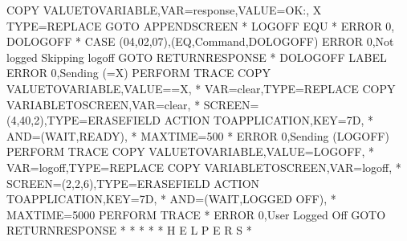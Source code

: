 \documentclass[letterpaper,10pt,english]{sphinxmanual}
\begin{document}
\begin{sphinxVerbatim}[commandchars=\\\{\}]
   COPY\PYGZdl{} VALUE\PYGZhy{}TO\PYGZhy{}VARIABLE,VAR=\PYGZsq{}response\PYGZsq{},VALUE=\PYGZsq{}OK:\PYGZsq{},           X
         TYPE=REPLACE
   GOTO\PYGZdl{} APPEND\PYGZus{}SCREEN
*
LOGOFF   EQU   *
   ERROR\PYGZdl{} 0,\PYGZsq{}\PYGZhy{}\PYGZhy{}\PYGZhy{} DOLOGOFF\PYGZsq{}
*
   CASE\PYGZdl{} (04,02,07),(EQ,\PYGZsq{}Command\PYGZsq{},DOLOGOFF)
   ERROR\PYGZdl{} 0,\PYGZsq{}Not logged \PYGZhy{} Skipping logoff\PYGZsq{}
   GOTO\PYGZdl{} RETURN\PYGZus{}RESPONSE
*
DOLOGOFF LABEL\PYGZdl{}
   ERROR\PYGZdl{} 0,\PYGZsq{}Sending (=X)\PYGZsq{}
   PERFORM\PYGZdl{} TRACE
   COPY\PYGZdl{} VALUE\PYGZhy{}TO\PYGZhy{}VARIABLE,VALUE=\PYGZsq{}=X\PYGZsq{},                           *
         VAR=\PYGZsq{}clear\PYGZsq{},TYPE=REPLACE
   COPY\PYGZdl{} VARIABLE\PYGZhy{}TO\PYGZhy{}SCREEN,VAR=\PYGZsq{}clear\PYGZsq{},                         *
         SCREEN=(4,40,2),TYPE=ERASE\PYGZhy{}FIELD
   ACTION\PYGZdl{}  TO\PYGZhy{}APPLICATION,KEY=7D,                               *
         AND=(WAIT,\PYGZsq{}READY\PYGZsq{}),                                     *
         MAXTIME=500
*
   ERROR\PYGZdl{} 0,\PYGZsq{}Sending (LOGOFF)\PYGZsq{}
   PERFORM\PYGZdl{} TRACE
   COPY\PYGZdl{} VALUE\PYGZhy{}TO\PYGZhy{}VARIABLE,VALUE=\PYGZsq{}LOGOFF\PYGZsq{},                       *
         VAR=\PYGZsq{}logoff\PYGZsq{},TYPE=REPLACE
   COPY\PYGZdl{} VARIABLE\PYGZhy{}TO\PYGZhy{}SCREEN,VAR=\PYGZsq{}logoff\PYGZsq{},                        *
         SCREEN=(2,2,6),TYPE=ERASE\PYGZhy{}FIELD
   ACTION\PYGZdl{}  TO\PYGZhy{}APPLICATION,KEY=7D,                               *
         AND=(WAIT,\PYGZsq{}LOGGED OFF\PYGZsq{}),                                *
         MAXTIME=5000
   PERFORM\PYGZdl{} TRACE
*
   ERROR\PYGZdl{} 0,\PYGZsq{}User Logged Off\PYGZsq{}
   GOTO\PYGZdl{} RETURN\PYGZus{}RESPONSE
*
*
*
*\PYGZsh{}\PYGZsh{}\PYGZsh{}\PYGZsh{}\PYGZsh{}\PYGZsh{}\PYGZsh{}\PYGZsh{}\PYGZsh{}\PYGZsh{}\PYGZsh{}\PYGZsh{}\PYGZsh{}\PYGZsh{}\PYGZsh{}\PYGZsh{}\PYGZsh{}\PYGZsh{}\PYGZsh{}\PYGZsh{}\PYGZsh{}\PYGZsh{}\PYGZsh{}\PYGZsh{}\PYGZsh{}\PYGZsh{}\PYGZsh{}\PYGZsh{}\PYGZsh{}\PYGZsh{}\PYGZsh{}\PYGZsh{}\PYGZsh{}\PYGZsh{}\PYGZsh{}\PYGZsh{}\PYGZsh{}\PYGZsh{}\PYGZsh{}\PYGZsh{}\PYGZsh{}\PYGZsh{}\PYGZsh{}\PYGZsh{}\PYGZsh{}\PYGZsh{}\PYGZsh{}\PYGZsh{}\PYGZsh{}\PYGZsh{}\PYGZsh{}\PYGZsh{}\PYGZsh{}\PYGZsh{}\PYGZsh{}\PYGZsh{}\PYGZsh{}\PYGZsh{}\PYGZsh{}\PYGZsh{}\PYGZsh{}\PYGZsh{}\PYGZsh{}\PYGZsh{}\PYGZsh{}\PYGZsh{}\PYGZsh{}\PYGZsh{}\PYGZsh{}\PYGZsh{}
*\PYGZsh{}\PYGZsh{}                          H E L P E R S                           \PYGZsh{}\PYGZsh{}
*\PYGZsh{}\PYGZsh{}\PYGZsh{}\PYGZsh{}\PYGZsh{}\PYGZsh{}\PYGZsh{}\PYGZsh{}\PYGZsh{}\PYGZsh{}\PYGZsh{}\PYGZsh{}\PYGZsh{}\PYGZsh{}\PYGZsh{}\PYGZsh{}\PYGZsh{}\PYGZsh{}\PYGZsh{}\PYGZsh{}\PYGZsh{}\PYGZsh{}\PYGZsh{}\PYGZsh{}\PYGZsh{}\PYGZsh{}\PYGZsh{}\PYGZsh{}\PYGZsh{}\PYGZsh{}\PYGZsh{}\PYGZsh{}\PYGZsh{}\PYGZsh{}\PYGZsh{}\PYGZsh{}\PYGZsh{}\PYGZsh{}\PYGZsh{}\PYGZsh{}\PYGZsh{}\PYGZsh{}\PYGZsh{}\PYGZsh{}\PYGZsh{}\PYGZsh{}\PYGZsh{}\PYGZsh{}\PYGZsh{}\PYGZsh{}\PYGZsh{}\PYGZsh{}\PYGZsh{}\PYGZsh{}\PYGZsh{}\PYGZsh{}\PYGZsh{}\PYGZsh{}\PYGZsh{}\PYGZsh{}\PYGZsh{}\PYGZsh{}\PYGZsh{}\PYGZsh{}\PYGZsh{}\PYGZsh{}\PYGZsh{}\PYGZsh{}\PYGZsh{}\PYGZsh{}

\end{sphinxVerbatim}
\end{document}
